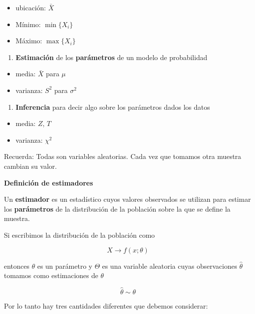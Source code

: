 \documentclass[
]{book}
\providecommand{\tightlist}{%
  \setlength{\itemsep}{0pt}\setlength{\parskip}{0pt}}
\begin{document}
\begin{itemize}
\tightlist
\item
  ubicación: \(\bar{X}\)
\item
  Mínimo: \(\min\{X_i\}\)
\item
  Máximo: \(\max\{X_i\}\)
\end{itemize}

\begin{enumerate}
\def\labelenumi{\arabic{enumi}.}
\setcounter{enumi}{1}
\tightlist
\item
  \textbf{Estimación} de los \textbf{parámetros} de un modelo de probabilidad
\end{enumerate}

\begin{itemize}
\tightlist
\item
  media: \(\bar{X}\) para \(\mu\)
\item
  varianza: \(S^2\) para \(\sigma^2\)
\end{itemize}

\begin{enumerate}
\def\labelenumi{\arabic{enumi}.}
\setcounter{enumi}{2}
\tightlist
\item
  \textbf{Inferencia} para decir algo sobre los parámetros dados los datos
\end{enumerate}

\begin{itemize}
\tightlist
\item
  media: \(Z\), \(T\)
\item
  varianza: \(\chi^2\)
\end{itemize}

Recuerda: Todas son variables aleatorias. Cada vez que tomamos otra muestra cambian su valor.

\textbf{Definición de estimadores}

Un \textbf{estimador} es un estadístico cuyos valores observados se utilizan para estimar los \textbf{parámetros} de la distribución de la población sobre la que se define la muestra.

Si escribimos la distribución de la población como

\[X \rightarrow f(x; \theta)\]

entonces \(\theta\) es un parámetro y \(\Theta\) es una variable aleatoria cuyas observaciones \(\hat{\theta}\) tomamos como estimaciones de \(\theta\)

\[\hat{\theta} \sim \theta\]

Por lo tanto hay tres cantidades diferentes que debemos considerar:
\end{document}
